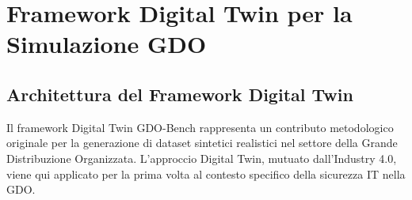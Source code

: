 
\chapter{\texorpdfstring{Framework Digital Twin per la Simulazione GDO}{Appendice B - Framework Digital Twin per la Simulazione GDO}}
\label{app:digital-twin}

\section{\texorpdfstring{Architettura del Framework Digital Twin}{B.1 - Architettura del Framework Digital Twin}}


Il framework Digital Twin GDO-Bench rappresenta un contributo metodologico originale per la generazione di dataset sintetici realistici nel settore della Grande Distribuzione Organizzata. L'approccio Digital Twin, mutuato dall'Industry 4.0\autocite{tao2019digital}, viene qui applicato per la prima volta al contesto specifico della sicurezza IT nella GDO.
